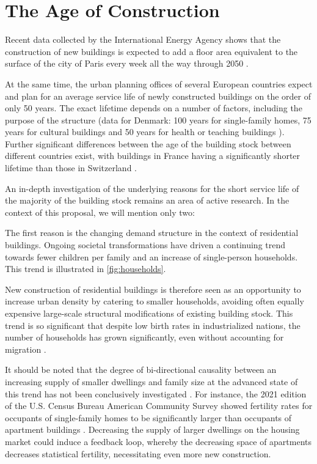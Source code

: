 \documentclass{article}
\begin{document}
\clearpage
\section{The Age of Construction}
\label{sec:construction}

\begin{multicols}{2}

Recent data collected by the International Energy Agency shows that the construction of new buildings is expected to add a floor area equivalent to the surface of the city of Paris every week all the way through 2050 \cite[Sec. 3.7]{cozzi_net_2021}.

At the same time, the urban planning offices of several European countries expect and plan for an average service life of newly constructed buildings on the order of only 50 years. The exact lifetime depends on a number of factors, including the purpose of the structure (data for Denmark: 100 years for single-family homes, 75 years for cultural buildings and 50 years for health or teaching buildings \cite{andersen_lifespan_2023}). Further significant differences between the age of the building stock between different countries exist, with buildings in France having a significantly shorter lifetime \cite{noauthor_value_2013} than those in Switzerland \cite{kornmann_service_2012}.

An in-depth investigation of the underlying reasons for the short service life of the majority of the building stock remains an area of active research. In the context of this proposal, we will mention only two:

The first reason is the changing demand structure in the context of residential buildings. Ongoing societal transformations have driven a continuing trend towards fewer children per family and an increase of single-person households. This trend is illustrated in \cref{fig:households}.

New construction of residential buildings is therefore seen as an opportunity to increase urban density by catering to smaller households, avoiding often equally expensive large-scale structural modifications of existing building stock. This trend is so significant that despite low birth rates in industrialized nations, the number of households has grown significantly, even without accounting for migration \cite{noauthor_why_2014}.

It should be noted that the degree of bi-directional causality between an increasing supply of smaller dwellings and family size at the advanced state of this trend has not been conclusively investigated \cite{kulu_fertility_2007}. For instance, the 2021 edition of the U.S. Census Bureau American Community Survey showed fertility rates for occupants of single-family homes to be significantly larger than occupants of apartment buildings \cite{noauthor_american_2021}. Decreasing the supply of larger dwellings on the housing market could induce a feedback loop, whereby the decreasing space of apartments decreases statistical fertility, necessitating even more new construction.

\end{multicols}
\end{document}
